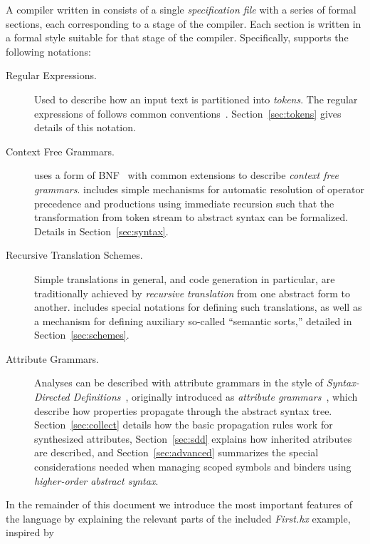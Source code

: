 \documentclass[11pt]{article} %
\begin{document}
A compiler written in \HAX consists of a single \emph{specification file} with a series of formal
sections, each corresponding to a stage of the compiler.  Each section is written in a formal style
suitable for that stage of the compiler. Specifically, \HAX supports the following notations:
\begin{description}

\item[Regular Expressions.] Used to describe how an input text is partitioned into
  \emph{tokens}. The regular expressions of \HAX follows common
  conventions~\cite{Aho+:2006}. Section~\ref{sec:tokens} gives details of this notation.

\item[Context Free Grammars.] \HAX uses a form of BNF~\cite{NaurEtal:cacm1960} with common
  extensions to describe \emph{context free grammars}. \HAX includes simple mechanisms for automatic
  resolution of operator precedence and productions using immediate recursion such that the
  transformation from token stream to abstract syntax can be formalized. Details in
  Section~\ref{sec:syntax}.

\item[Recursive Translation Schemes.] Simple translations in general, and code generation in
  particular, are traditionally achieved by \emph{recursive translation} from one abstract form to
  another.  \HAX includes special notations for defining such translations, as well as a mechanism
  for defining auxiliary so-called ``semantic sorts,'' detailed in Section~\ref{sec:schemes}.

\item[Attribute Grammars.] Analyses can be described with attribute grammars in the style of
  \emph{Syntax-Directed Definitions}~\cite{Aho+:2006}, originally introduced as \emph{attribute
    grammars}~\cite{Knuth:mst1968}, which describe how properties propagate through the abstract
  syntax tree.  Section~\ref{sec:collect} details how the basic propagation rules work for
  synthesized attributes, Section~\ref{sec:sdd} explains how inherited atributes are described, and
  Section~\ref{sec:advanced} summarizes the special considerations needed when managing scoped
  symbols and binders using \emph{higher-order abstract syntax}.

\end{description}
In the remainder of this document we introduce the most important features of the \HAX language by
explaining the relevant parts of the included \emph{First.hx} example, inspired by
\end{document}
